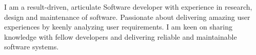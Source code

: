 \documentclass[9pt]{developercv} %
\begin{document}
\vspace{0.5cm}



\begin{minipage}[t]{0.5\textwidth} %
	\vspace{-\baselineskip} %
	
	I am a result-driven, articulate Software developer with experience in research,
	design and maintenance of software. Passionate about delivering amazing user
	experiences by keenly analyzing user requirements. 
	I am keen on sharing knowledge with fellow developers and delivering reliable and 
	maintainable software systems. 
\end{minipage}
\hfill %
\begin{minipage}[t]{0.4\textwidth} %
	\vspace{-\baselineskip} %
	\begin{barchart}{5.5}
	\end{barchart}
\end{minipage}

\begin{center}
\end{center}


\end{document}
